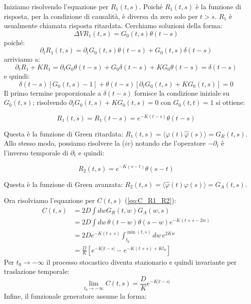 Iniziamo risolvendo l'equazione per $R_1(t,s)$. Poiché $R_1(t,s)$ è la funzione di risposta, per la condizione di causalità, è diversa da zero solo per $t > s$. $R_1$ è usualmente chiamata risposta ritardata. Cerchiamo soluzioni della forma:
\begin{equation}
\Delta V R_1(t,s) = G_0(t,s)\theta(t-s)
\end{equation}
poiché:
\begin{equation}
\partial_t R_1(t,s) = \partial_t G_0(t,s)\theta(t-s) + G_0(t,s)\delta(t-s)
\end{equation}
arriviamo a:
\begin{equation}
\partial_t R_1 + KR_1 = \partial_t G_0\theta(t-s) + G_0\delta(t-s) + KG_0\theta(t-s) = \delta(t-s)
\end{equation}
e quindi:
\begin{equation}
\delta(t-s)[G_0(t,s)-1] + \theta(t-s)[\partial_t G_0(t,s) + KG_0(t,s)] = 0
\end{equation}
Il primo termine proporzionale a $\delta(t-s)$ fornisce la condizione iniziale su $G_0(t,s)$; risolvendo $\partial_t G_0(t,s) + KG_0(t,s) = 0$ con $G_0(t,t) = 1$ si ottiene:

\begin{tcolorbox}[colback=colorA!5, colframe=colorA, arc=3mm, boxrule=1.2pt]
\begin{equation}
R_1(t,s) = R_1(t-s) = e^{-K(t-s)}\theta(t-s)
\end{equation}
\end{tcolorbox}

Questa è la funzione di Green ritardata: $R_1(t,s) = \langle\varphi(t)\hat{\varphi}(s)\rangle =G_R(t,s)$.
Allo stesso modo, possiamo risolvere la ($iv$) notando che l'operatore $-\partial_t$ è l'inverso temporale di $\partial_t$ e quindi:

\begin{tcolorbox}[colback=colorA!5, colframe=colorA, arc=3mm, boxrule=1.2pt]
\begin{equation}
R_2(t,s)= e^{-K(s-t)}\theta(s-t)
\end{equation}
\end{tcolorbox}

Questa è la funzione di Green avanzata: $R_2(t,s) = \langle\hat{\varphi}(t)\varphi(s)\rangle = G_A (t,s)$.


Ora risolviamo l'equazione per $C(t,s)$ (\ref{eq:C_R1_R2}):
\begin{align}
C(t,s) &= 2D \int dw G_R(t,w)G_A(w,s) \nonumber \\ 
&= 2D \int dw \, \theta(t-w)\theta(s-w) e^{-K(t+s-2w)} \nonumber \\ 
&= 2De^{-K(t+s)} \int_{t_0}^{\min(t,s)} dw \, e^{2Kw} \nonumber \\ 
&= \frac{D}{K} \left[ e^{-K|t-s|} - e^{-K(t+s) + K t_0} \right]
\end{align}
Per $t_0 \to -\infty$ il processo stocastico diventa stazionario e quindi invariante per traslazione temporale:
\begin{equation} 
\lim_{t_0 \to -\infty} C(t,s) = \frac{D}{K} e^{-K|t-s|} 
\end{equation}
Infine, il funzionale generatore assume la forma:


